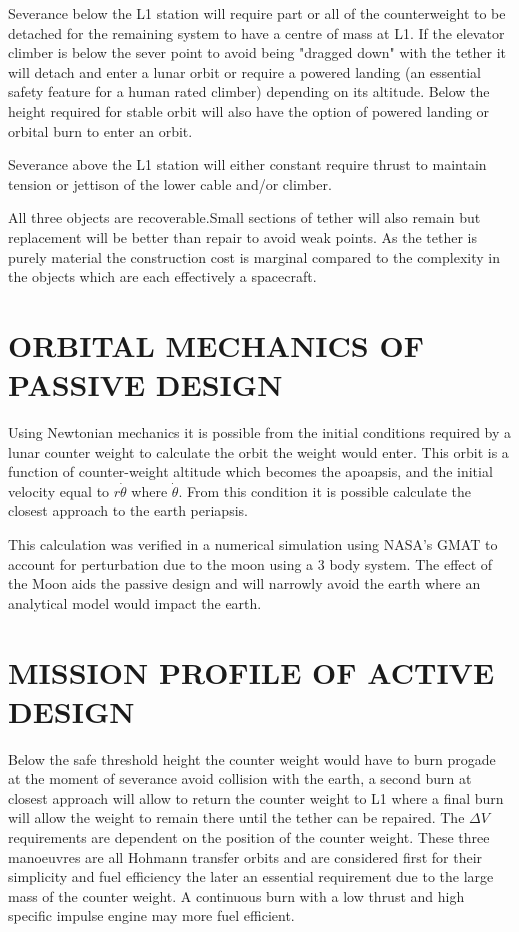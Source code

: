 \documentclass[twocolumn,prl,nobalancelastpage,aps,10pt]{revtex4-1}
\begin{document}
Severance below the L1 station will require part or all of the counterweight to be detached for the remaining system to have a centre of mass at L1. If the elevator climber is below the sever point to avoid being "dragged down" with the tether it will detach and enter a lunar orbit or require a powered landing (an essential safety feature for a human rated climber) depending on its altitude. Below the height required for stable orbit will also have the option of powered landing or orbital burn to enter an orbit.

Severance above the L1 station will either constant require thrust to maintain tension or jettison of the lower cable and/or climber.

All three objects are recoverable.Small sections of tether will also remain but replacement will be better than repair to avoid weak points. As the tether is purely material the construction cost is marginal compared to the complexity in the objects which are each effectively a spacecraft.

\section{ORBITAL MECHANICS OF PASSIVE DESIGN}

Using Newtonian mechanics it is possible from the initial conditions required by a lunar counter weight to calculate the orbit the weight would enter. This orbit is a function of counter-weight altitude which becomes the apoapsis, and the initial velocity equal to $r\dot{\theta}$ where $\dot{\theta}$. From this condition it is possible calculate the closest approach to the earth periapsis.

This calculation was verified in a numerical simulation using NASA's GMAT to account for perturbation due to the moon using a 3 body system. The effect of the Moon aids the passive design and will narrowly avoid the earth where an analytical model would impact the earth.

\section{MISSION PROFILE OF ACTIVE DESIGN}

Below the safe threshold height the counter weight would have to burn progade at the moment of severance avoid collision with the earth, a second burn at closest approach will allow to return the counter weight to L1 where a final burn will allow the weight to remain there until the tether can be repaired. The $\Delta V$ requirements are dependent on the position of the counter weight. These three manoeuvres are all Hohmann transfer orbits and are considered first for their simplicity and fuel efficiency the later an essential requirement due to the large mass of the counter weight. A continuous burn with a low thrust and high specific impulse engine may more fuel efficient.
\end{document}
